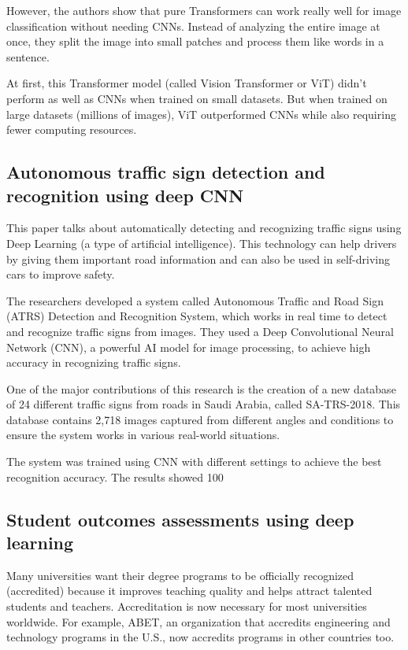 \documentclass{article}
\begin{document}
However, the authors show that pure Transformers can work really well for image classification without needing CNNs. Instead of analyzing the entire image at once, they split the image into small patches and process them like words in a sentence.

At first, this Transformer model (called Vision Transformer or ViT) didn’t perform as well as CNNs when trained on small datasets. But when trained on large datasets (millions of images), ViT outperformed CNNs while also requiring fewer computing resources.
\subsection{Autonomous traffic sign detection and recognition using deep CNN}
This paper talks about automatically detecting and recognizing traffic signs using Deep Learning (a type of artificial intelligence). This technology can help drivers by giving them important road information and can also be used in self-driving cars to improve safety.

The researchers developed a system called Autonomous Traffic and Road Sign (ATRS) Detection and Recognition System, which works in real time to detect and recognize traffic signs from images. They used a Deep Convolutional Neural Network (CNN), a powerful AI model for image processing, to achieve high accuracy in recognizing traffic signs.

One of the major contributions of this research is the creation of a new database of 24 different traffic signs from roads in Saudi Arabia, called SA-TRS-2018. This database contains 2,718 images captured from different angles and conditions to ensure the system works in various real-world situations.

The system was trained using CNN with different settings to achieve the best recognition accuracy. The results showed 100%

\subsection{Student outcomes assessments using deep learning}
Many universities want their degree programs to be officially recognized (accredited) because it improves teaching quality and helps attract talented students and teachers. Accreditation is now necessary for most universities worldwide. For example, ABET, an organization that accredits engineering and technology programs in the U.S., now accredits programs in other countries too.
\end{document}
